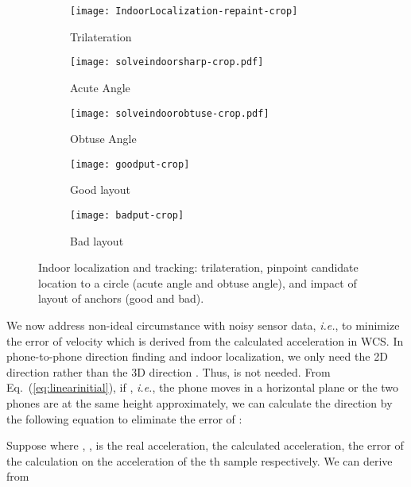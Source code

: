 \documentclass[]{sig-alternate-10pt}
\def\ie{\textit{i.e.}\xspace}
\newcommand{\eqqref}[1]{Eq.~(\ref{#1})}
\begin{document}
 \begin{figure*}
     \begin{centering}
         \begin{subfigure}{0.30\textwidth}
             {\texttt{[image: IndoorLocalization-repaint-crop]}}
             \caption{Trilateration}
             \label{fig:Fine-grained-Indoor-Location}
         \end{subfigure}
         \begin{subfigure}{0.16\textwidth}
             {\texttt{[image: solveindoorsharp-crop.pdf]}}
             \caption{Acute Angle}
             \label{fig:solveindoor-a}
\end{subfigure}
         \begin{subfigure}{0.16\textwidth}
             {\texttt{[image: solveindoorobtuse-crop.pdf]}}
             \caption{Obtuse Angle}
             \label{fig:solveindoor-b}
         \end{subfigure}
         \begin{subfigure}{0.16\textwidth}
             {\texttt{[image: goodput-crop]}}
             \caption{Good layout}
             \label{fig:layout-g}
         \end{subfigure}
         \begin{subfigure}{0.18\textwidth}
             {\texttt{[image: badput-crop]}}
             \caption{Bad layout}
             \label{fig:layout-b}
         \end{subfigure}
         \caption{Indoor localization and tracking: trilateration, pinpoint
             candidate location to a circle (acute angle and obtuse angle), and
         impact of layout  of anchors (good and bad).}
         \label{fig:location-cases}
     \end{centering}
 \end{figure*}

We now address non-ideal circumstance with noisy sensor data, \ie,
 to minimize the error of velocity
 which is derived from the calculated acceleration in WCS.
In phone-to-phone direction finding and indoor localization, we only need
the 2D direction  rather than the 3D direction
. Thus,  is not needed. From \eqqref{eq:linearinitial}, if
, \ie, the phone moves in a horizontal plane or the two phones are at
the same height approximately, we can calculate the direction by
 the following equation to eliminate the error of :


Suppose  where , ,
 is the real acceleration, the calculated acceleration,
the error of the calculation on the acceleration of the th sample respectively. We can
derive  from
\end{document}
